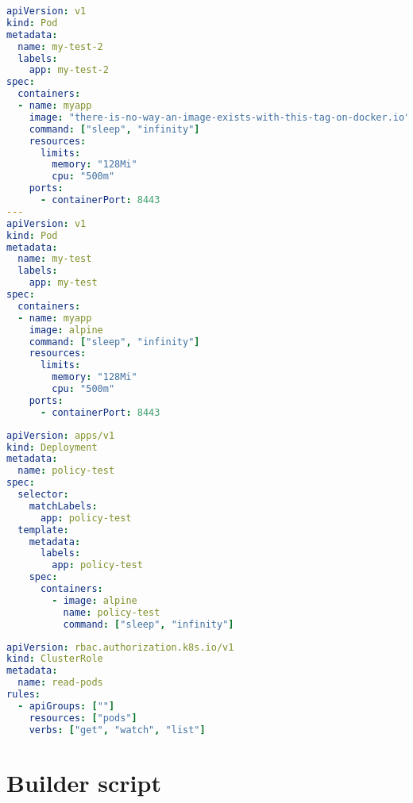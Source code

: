 \begin{lstlisting}[caption={junk.yaml},language=YAML,label=appendix:csr:junk]
apiVersion: v1
kind: Pod
metadata:
  name: my-test-2
  labels:
    app: my-test-2
spec:
  containers:
  - name: myapp
    image: "there-is-no-way-an-image-exists-with-this-tag-on-docker.io"
    command: ["sleep", "infinity"]
    resources:
      limits:
        memory: "128Mi"
        cpu: "500m"
    ports:
      - containerPort: 8443
---
apiVersion: v1
kind: Pod
metadata:
  name: my-test
  labels:
    app: my-test
spec:
  containers:
  - name: myapp
    image: alpine
    command: ["sleep", "infinity"]
    resources:
      limits:
        memory: "128Mi"
        cpu: "500m"
    ports:
      - containerPort: 8443
\end{lstlisting}

\begin{lstlisting}[caption={test-policy.yaml},language=YAML,label=appendix:csr:testpolicy]
apiVersion: apps/v1
kind: Deployment
metadata:
  name: policy-test
spec:
  selector:
    matchLabels:
      app: policy-test
  template:
    metadata:
      labels:
        app: policy-test
    spec:
      containers:
        - image: alpine
          name: policy-test
          command: ["sleep", "infinity"]
\end{lstlisting}

\begin{lstlisting}[caption={readPods.yaml},language=YAML,label=appendix:csr:readpods]
apiVersion: rbac.authorization.k8s.io/v1
kind: ClusterRole
metadata:
  name: read-pods
rules:
  - apiGroups: [""]
    resources: ["pods"]
    verbs: ["get", "watch", "list"]
\end{lstlisting}

\clearpage\section{Builder script}

